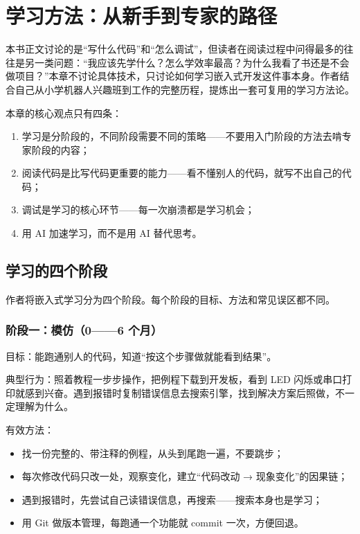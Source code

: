 \chapter{学习方法：从新手到专家的路径} \label{app:learning-methodology}

本书正文讨论的是“写什么代码”和“怎么调试”，但读者在阅读过程中问得最多的往往是另一类问题：“我应该先学什么？怎么学效率最高？为什么我看了书还是不会做项目？”本章不讨论具体技术，只讨论如何学习嵌入式开发这件事本身。作者结合自己从小学机器人兴趣班到工作的完整历程，提炼出一套可复用的学习方法论。

本章的核心观点只有四条：
\begin{enumerate}
	\item 学习是分阶段的，不同阶段需要不同的策略——不要用入门阶段的方法去啃专家阶段的内容；
	\item 阅读代码是比写代码更重要的能力——看不懂别人的代码，就写不出自己的代码；
	\item 调试是学习的核心环节——每一次崩溃都是学习机会；
	\item 用 AI 加速学习，而不是用 AI 替代思考。
\end{enumerate}

\section{学习的四个阶段}

作者将嵌入式学习分为四个阶段。每个阶段的目标、方法和常见误区都不同。

\subsection*{阶段一：模仿（0——6 个月）}

目标：能跑通别人的代码，知道“按这个步骤做就能看到结果”。

典型行为：照着教程一步步操作，把例程下载到开发板，看到 LED 闪烁或串口打印就感到兴奋。遇到报错时复制错误信息去搜索引擎，找到解决方案后照做，不一定理解为什么。

有效方法：
\begin{itemize}
	\item 找一份完整的、带注释的例程，从头到尾跑一遍，不要跳步；
	\item 每次修改代码只改一处，观察变化，建立“代码改动 → 现象变化”的因果链；
	\item 遇到报错时，先尝试自己读错误信息，再搜索——搜索本身也是学习；
	\item 用 Git 做版本管理，每跑通一个功能就 commit 一次，方便回退。
\end{itemize}

